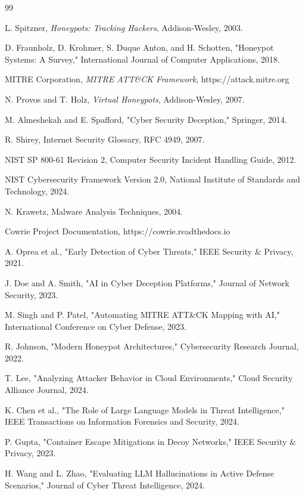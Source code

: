 \documentclass[12pt,a4paper]{report}
\begin{document}
\begin{thebibliography}{99}

L. Spitzner,
\textit{Honeypots: Tracking Hackers},
Addison-Wesley, 2003.

D. Fraunholz, D. Krohmer, S. Duque Anton, and H. Schotten,
"Honeypot Systems: A Survey,"
International Journal of Computer Applications,
2018.

MITRE Corporation,
\textit{MITRE ATT\&CK Framework},
https://attack.mitre.org

N. Provos and T. Holz,
\textit{Virtual Honeypots},
Addison-Wesley,
2007.

M. Almeshekah and E. Spafford,
"Cyber Security Deception,"
Springer,
2014.

R. Shirey,
Internet Security Glossary,
RFC 4949,
2007.

NIST SP 800-61 Revision 2,
Computer Security Incident Handling Guide,
2012.

NIST Cybersecurity Framework Version 2.0,
National Institute of Standards and Technology,
2024.

N. Krawetz,
Malware Analysis Techniques,
2004.

Cowrie Project Documentation,
https://cowrie.readthedocs.io

A. Oprea et al.,
"Early Detection of Cyber Threats,"
IEEE Security \& Privacy, 2021.

J. Doe and A. Smith,
"AI in Cyber Deception Platforms,"
Journal of Network Security, 2023.

M. Singh and P. Patel,
"Automating MITRE ATT\&CK Mapping with AI,"
International Conference on Cyber Defense, 2023.

R. Johnson,
"Modern Honeypot Architectures,"
Cybersecurity Research Journal, 2022.

T. Lee,
"Analyzing Attacker Behavior in Cloud Environments,"
Cloud Security Alliance Journal, 2024.

K. Chen et al.,
"The Role of Large Language Models in Threat Intelligence,"
IEEE Transactions on Information Forensics and Security, 2024.

P. Gupta,
"Container Escape Mitigations in Decoy Networks,"
IEEE Security \& Privacy, 2023.

H. Wang and L. Zhao,
"Evaluating LLM Hallucinations in Active Defense Scenarios,"
Journal of Cyber Threat Intelligence, 2024.


\end{thebibliography}
\end{document}
